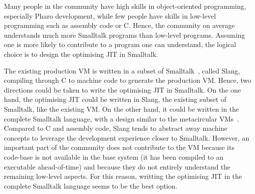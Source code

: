 \documentclass[a4paper,12pt,twoside]{../includes/ThesisStyle}
\begin{document}
Many people in the community have high skills in object-oriented programming, especially Pharo development, while few people have skills in low-level programming such as assembly code or C. Hence, the community on average understands much more Smalltalk programs than low-level programs. Assuming one is more likely to contribute to a program one can understand, the logical choice is to design the optimising JIT in Smalltalk.

The existing production VM is written in a subset of Smalltalk~\cite{Inga97a}, called Slang, compiling through C to machine code to generate the production VM. Hence, two directions could be taken to write the optimising JIT in Smalltalk. On the one hand, the optimising JIT could be written in Slang, the existing subset of Smalltalk, like the existing VM. On the other hand, it could be written in the complete Smalltalk language, with a design similar to the metacircular VMs~\cite{Unga05b,Wimm13a,Alp99a}. Compared to C and assembly code, Slang tends to abstract away machine concepts to leverage the development experience closer to Smalltalk. However, an important part of the community does not contribute to the VM because its code-base is not available in the base system (it has been compiled to an executable ahead-of-time) and because they do not entirely understand the remaining low-level aspects. For this reason, writting the optimising JIT in the complete Smalltalk language seems to be the best option.

\end{document}
